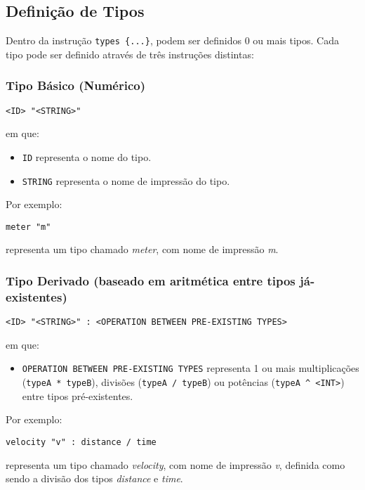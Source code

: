 \documentclass{report}
\begin{document}
\pagebreak
\subsection{Definição de Tipos}
Dentro da instrução \texttt{types \{...\}}, podem ser definidos 0 ou mais tipos. Cada tipo pode ser definido através de três instruções distintas:
\subsubsection{Tipo Básico (Numérico)}
\begin{lstlisting}[caption= Linguagem de Definição de Tipos - Instrução de definição de tipo básico (numérico)]
<ID> "<STRING>" 	
\end{lstlisting}
em que:
\begin{itemize}
    \item \texttt{ID} representa o nome do tipo.
    \item \texttt{STRING} representa o nome de impressão do tipo.
\end{itemize}
\noindent
Por exemplo:
\begin{lstlisting}
meter "m" 	
\end{lstlisting}
representa um tipo chamado \textit{meter}, com nome de impressão \textit{m}.

\subsubsection{Tipo Derivado (baseado em aritmética entre tipos já-existentes)}
\begin{lstlisting}[caption= Linguagem de Definição de Tipos - Instrução de definição de tipo derivado (baseado em aritmética entre tipos já-existentes)]
<ID> "<STRING>" : <OPERATION BETWEEN PRE-EXISTING TYPES>	
\end{lstlisting}
em que:
\begin{itemize}
    \item \texttt{OPERATION BETWEEN PRE-EXISTING TYPES} representa 1 ou mais multiplicações  (\texttt{typeA * typeB}), divisões (\texttt{typeA / typeB}) ou potências (\texttt{typeA \string^ <INT>}) entre tipos pré-existentes.
\end{itemize}
\noindent
Por exemplo:
\begin{lstlisting}
velocity "v" : distance / time
\end{lstlisting}
representa um tipo chamado \textit{velocity}, com nome de impressão \textit{v}, definida como sendo a divisão dos tipos \textit{distance} e \textit{time}.
\end{document}
